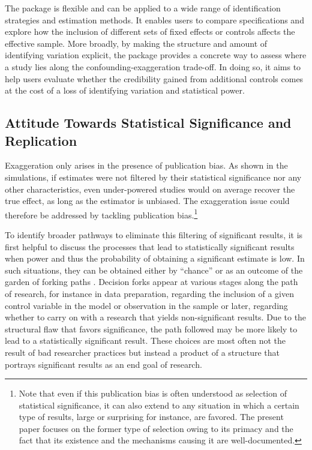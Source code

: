 \documentclass[usletter, 12pt]{article}
\begin{document}
				The package is flexible and can be applied to a wide range of identification strategies and estimation methods. It enables users to compare specifications and explore how the inclusion of different sets of fixed effects or controls affects the effective sample. More broadly, by making the structure and amount of identifying variation explicit, the package provides a concrete way to assess where a study lies along the confounding-exaggeration trade-off. In doing so, it aims to help users evaluate whether the credibility gained from additional controls comes at the cost of a loss of identifying variation and statistical power.
			
				
		\subsection{Attitude Towards Statistical Significance and Replication}
	
			Exaggeration only arises in the presence of publication bias. As shown in the simulations, if estimates were not filtered by their statistical significance nor any other characteristics, even under-powered studies would on average recover the true effect, as long as the estimator is unbiased. The exaggeration issue could therefore be addressed by tackling publication bias.\footnote{Note that even if this publication bias is often understood as selection of statistical significance, it can also extend to any situation in which a certain type of results, large or surprising for instance, are favored. The present paper focuses on the former type of selection owing to its primacy and the fact that its existence and the mechanisms causing it are well-documented.}
		
			To identify broader pathways to eliminate this filtering of significant results, it is first helpful to discuss the processes that lead to statistically significant results when power and thus the probability of obtaining a significant estimate is low. In such situations, they can be obtained either by ``chance'' or as an outcome of the garden of forking paths \citep{simmons_false-positive_2011, gelman_garden_2013, kasy_forking_2021}. Decision forks appear at various stages along the path of research, for instance in data preparation, regarding the inclusion of a given control variable in the model or observation in the sample or later, regarding whether to carry on with a research that yields non-significant results. Due to the structural flaw that favors significance, the path followed may be more likely to lead to a statistically significant result. These choices are most often not the result of bad researcher practices but instead a product of a structure that portrays significant results as an end goal of research. 
		
\end{document}
